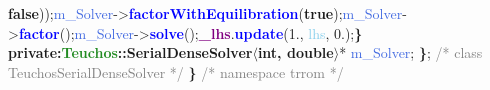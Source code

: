 \textbf{false}));\newline\newline\tab\tab\textcolor{RoyalBlue}{m\_Solver}-\textgreater\textbf{\textcolor{blue}{factorWithEquilibration}}(\textbf{true});\newline\tab\tab\textcolor{RoyalBlue}{m\_Solver}-\textgreater\textbf{\textcolor{blue}{factor}}();\newline\tab\tab\textcolor{RoyalBlue}{m\_Solver}-\textgreater\textbf{\textcolor{blue}{solve}}();\newline\newline\tab\tab\textbf{\textcolor{Purple}{\_lhs}}.\textbf{\textcolor{blue}{update}}(1., \textcolor{SkyBlue}{lhs}, 0.);\newline\tab\textbf{\}}\
         \newline\newline\textbf{private:}\newline\tab\textbf{\textcolor{ForestGreen}{Teuchos}::\textcolor{Melon}{SerialDenseSolver}$\langle$\textcolor{BrickRed}{int}, \textcolor{BrickRed}{double}$\rangle$}* \textcolor{RoyalBlue}{m\_Solver};\newline
    \textbf{\}}; \textcolor{gray}{/* class TeuchosSerialDenseSolver */} \newline
    \textbf{\}} \textcolor{gray}{/* namespace trrom */}

